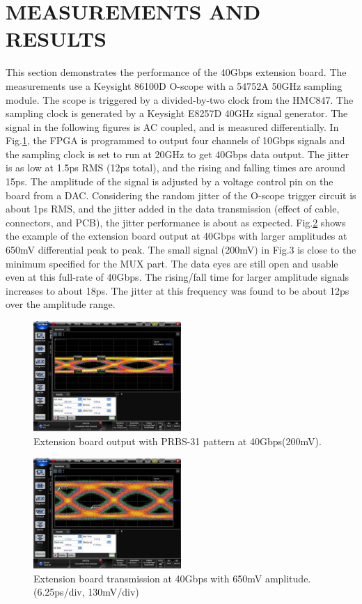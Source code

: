 \documentclass{article}
\begin{document}
\section{MEASUREMENTS AND RESULTS}
This section demonstrates the performance of the 40Gbps extension board. The measurements use a Keysight 86100D O-scope with a 54752A 50GHz sampling module. The scope is triggered by a divided-by-two clock from the HMC847. The sampling clock is generated by a Keysight E8257D 40GHz signal generator. The signal in the following figures is AC coupled, and is measured differentially. In Fig.\ref{fig:fig3}, the FPGA is programmed to output four channels of 10Gbps signals and the sampling clock is set to run at 20GHz to get 40Gbps data output. The jitter is as low at 1.5ps RMS (12ps total), and the rising and falling times are around 15ps. The amplitude of the signal is adjusted by a voltage control pin on the board from a DAC. Considering the random jitter of the O-scope trigger circuit is about 1ps RMS, and the jitter added in the data transmission (effect of cable, connectors, and PCB), the jitter performance is about as expected. Fig.\ref{fig:fig4} shows the example of the extension board output at 40Gbps with larger amplitudes at 650mV differential peak to peak. The small signal (200mV) in Fig.3 is close to the minimum specified for the MUX part. The data eyes are still open and usable even at this full-rate of 40Gbps. The rising/fall time for larger amplitude signals increases to about 18ps. The jitter at this frequency was found to be about 12ps over the amplitude range.

\begin{figure}
\centering
\includegraphics[width=0.5\textwidth]{fig3.png}
\caption{\label{fig:fig3}Extension board output with PRBS-31 pattern at 40Gbps(200mV).}
\end{figure}

\begin{figure}
\centering
\includegraphics[width=0.5\textwidth]{fig4.png}
\caption{\label{fig:fig4}Extension board transmission at 40Gbps with 650mV amplitude.(6.25ps/div, 130mV/div) }
\end{figure}
\end{document}
